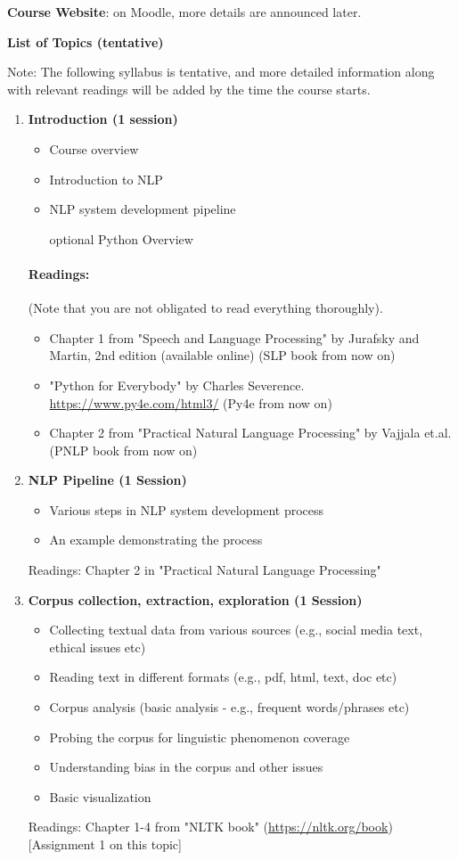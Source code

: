 \documentclass[11pt,a4paper]{article}
\begin{document}
\textbf{\large Course Website}: on Moodle, more details are announced later.

\textbf{\large List of Topics (tentative)}

Note: The following syllabus is tentative, and more detailed information along with relevant readings will be added by the time the course starts. 

\begin{enumerate}
\item \textbf{Introduction (1 session)}
\begin{itemize}
\item Course overview
\item Introduction to NLP
\item NLP system development pipeline
\item [optional] Python Overview 
\end{itemize}

\paragraph{Readings: } (Note that you are not obligated to read everything thoroughly).
\begin{itemize}
\item Chapter 1 from "Speech and Language Processing" by Jurafsky and Martin, 2nd edition (available online) (SLP book from now on) 
\item "Python for Everybody" by Charles Severence. \url{https://www.py4e.com/html3/} (Py4e from now on)
\item Chapter 2 from "Practical Natural Language Processing" by Vajjala et.al. (PNLP book from now on)
\end{itemize}

\item \textbf{NLP Pipeline (1 Session)}
\begin{itemize}
\item Various steps in NLP system development process
\item An example demonstrating the process 
\end{itemize}
Readings: Chapter 2 in "Practical Natural Language Processing"

\item \textbf{Corpus collection, extraction, exploration (1 Session)}
\begin{itemize}
\item Collecting textual data from various sources (e.g., social media text, ethical issues etc)
\item Reading text in different formats (e.g., pdf, html, text, doc etc)
\item Corpus analysis (basic analysis - e.g., frequent words/phrases etc)
\item Probing the corpus for linguistic phenomenon coverage
\item Understanding bias in the corpus and other issues
\item Basic visualization
\end{itemize}
Readings: Chapter 1-4 from "NLTK book" (\url{https://nltk.org/book}) 
[Assignment 1 on this topic]


\end{enumerate}
\end{document}
